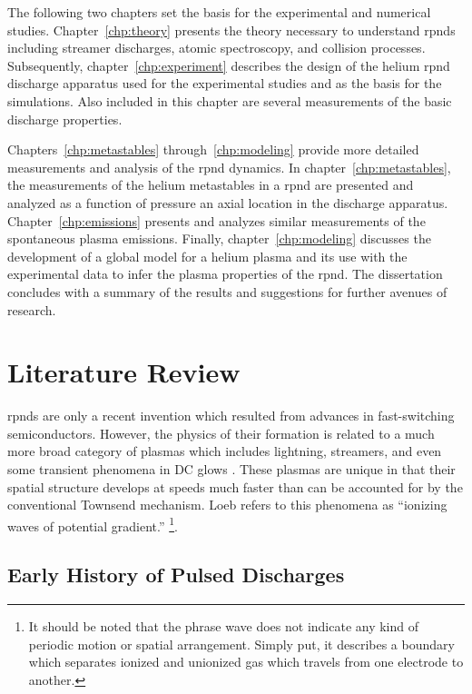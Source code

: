 The following two chapters set the basis for the experimental and numerical
studies. Chapter~\ref{chp:theory} presents the theory necessary to understand
\acs{rpnd}s including streamer discharges, atomic spectroscopy, and collision
processes. Subsequently, chapter~\ref{chp:experiment} describes the design of
the helium \acs{rpnd} discharge apparatus used for the experimental studies and
as the basis for the simulations. Also included in this chapter are several
measurements of the basic discharge properties.

Chapters~\ref{chp:metastables} through~\ref{chp:modeling} provide more detailed
measurements and analysis of the \acs{rpnd} dynamics. In
chapter~\ref{chp:metastables}, the measurements of the helium metastables in a
\acs{rpnd} are presented and analyzed as a function of pressure an axial
location in the discharge apparatus. Chapter~\ref{chp:emissions} presents and
analyzes similar measurements of the spontaneous plasma emissions. Finally,
chapter~\ref{chp:modeling} discusses the development of a global model for a
helium plasma and its use with the experimental data to infer the plasma
properties of the \acs{rpnd}. The dissertation concludes with a summary of the
results and suggestions for further avenues of research.

\section{Literature Review}

\acs{rpnd}s are only a recent invention which resulted from advances in
fast-switching semiconductors. However, the physics of their formation is
related to a much more broad category of plasmas which includes lightning,
streamers, and even some transient phenomena in DC glows \cite{Loeb1965}. These
plasmas are unique in that their spatial structure develops at speeds much
faster than can be accounted for by the conventional Townsend mechanism. Loeb
refers to this phenomena as ``ionizing waves of potential gradient.'' \footnote{It should be noted that the phrase wave does not indicate
any kind of periodic motion or spatial arrangement. Simply put, it describes a
boundary which separates ionized and unionized gas which travels from one
electrode to another.}.

\subsection{Early History of Pulsed Discharges}

